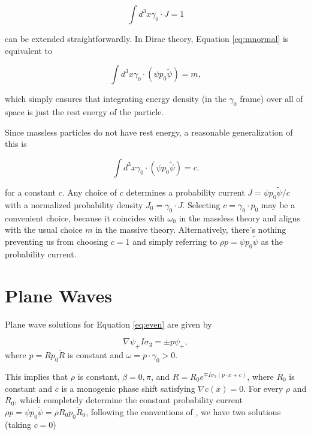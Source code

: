 \documentclass{article}
\begin{document}
  \begin{equation}
    \int d^3x \gamma_0 \cdot J = 1\label{eq:mnormal}
  \end{equation}

  can be extended straightforwardly. In Dirac theory, Equation \ref{eq:mnormal} is equivalent to

  \begin{equation}
    \int d^3x \gamma_0 \cdot (\psi p_0 \widetilde \psi) = m,
  \end{equation}

  which simply ensures that integrating energy density (in the $\gamma_0$ frame) over all of space is just the rest energy of the particle.

  Since massless particles do not have rest energy, a reasonable generalization of this is

  \begin{equation}
    \int d^3x \gamma_0 \cdot (\psi p_0 \widetilde \psi) = c. \label{eq:normalization}
  \end{equation}

  for a constant $c$. Any choice of $c$ determines a probability current $J = \psi p_0 \widetilde \psi / c$ with a normalized probability density $J_0 = \gamma_0 \cdot J$. Selecting $c = \gamma_0 \cdot p_0$ may be a convenient choice, because it coincides with $\omega_0$ in the massless theory and aligns with the usual choice $m$ in the massive theory. Alternatively, there's nothing preventing us from choosing $c = 1$ and simply referring to $\rho p = \psi p_0 \widetilde \psi$ as the probability current.

  \section{Plane Waves} \label{waves}

  Plane wave solutions for Equation \ref{eq:even} are given by

  \begin{equation}
    \nabla \psi_+ I \sigma_3 = \pm p \psi_+,\label{eq:plane}
  \end{equation}
  where $p = R p_0 \widetilde R$ is constant and $\omega = p \cdot \gamma_0 > 0$.

  This implies that $\rho$ is constant, $\beta = 0, \pi$, and $R = R_0 e^{\mp I \sigma_3 (p \cdot x + c)}$, where $R_0$ is constant and $c$ is a monogenic phase shift satisfying $\nabla c(x) = 0$. For every $\rho$ and $R_0$, which completely determine the constant probability current $\rho p = \psi p_0 \widetilde \psi = \rho R_0 p_0 \widetilde R_0$, following the conventions of \cite{gap}, we have two solutions (taking $c = 0$)
\end{document}
